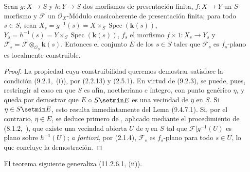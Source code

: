 \begin{proposition}[11.2.8]
\label{IV.11.2.8}
Sean $g:X\to S$ y $h:Y\to S$ dos morfismos de presentación finita, $f:X\to Y$ un $S$-morfismo y $\mathcal F$ un $\mathcal O_X$-Módulo cuasicoherente de presentación finita; para todo $s\in S$, sean $X_s=g^{-1}(s)=X\times_S\operatorname{Spec}(\boldsymbol{k}(s))$, $Y_s=h^{-1}(s)=Y\times_S\operatorname{Spec}(\boldsymbol{k}(s))$, $f_s$ el morfismo $f\times1:X_s\to Y_s$ y $\mathcal F_s=\mathcal F\otimes_{\mathcal O_S}\boldsymbol{k}(s)$. Entonces el conjunto $E$ de los $s\in S$ tales que $\mathcal F_s$ es $f_s$-plano es localmente construible.
\end{proposition}

\begin{proof}
La propiedad cuya construibilidad queremos demostrar satisface la condición
(9.2.1,~(\textup{i})), por (2.2.13) y (2.5.1). En virtud de
(9.2.3), se puede, pues, restringir al caso en que $S$ es
afín, noetheriano e íntegro, con punto genérico $\eta$, y queda por
demostrar que $E$ o $S\setmin E$ es una vecindad
de $\eta$ en $S$. Si
$\eta\in S\setmin E$, esto resulta inmediatamente del Lema
(9.4.7.1). Si, por el contrario, $\eta\in E$, se deduce primero
de , aplicado mediante el procedimiento de (8.1.2,~), que existe
una vecindad abierta $U$ de $\eta$ en $S$ tal que
$\mathcal F|g^{-1}(U)$ es plano sobre $h^{-1}(U)$; \emph{a
fortiori}, por (2.1.4), $\mathcal F_s$ es $f_s$-plano para todo
$s\in U$, lo que concluye la demostración.
\end{proof}

El teorema siguiente generaliza (11.2.6.1, (ii)).

